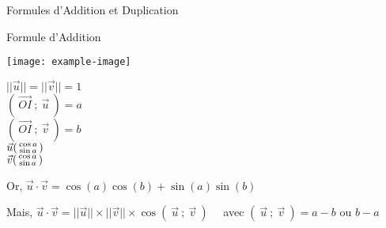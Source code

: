 \documentclass{cours}
\begin{document}
    \begin{Gpartie}{Formules d'Addition et Duplication} 
        \begin{Spartie}{Formule d'Addition} 
            \begin{center}
                    \texttt{[image: example-image]}
                \parbox{\linewidth}{}
            \end{center}
            $\lvert\lvert\vec{u}\rvert\rvert=\lvert\lvert\vec{v}\rvert\rvert=1$ \\ $\left(~\overrightarrow{OI}~;~\vec{u}~\right)=a$ \\ $\left(~\overrightarrow{OI}~;~\vec{v}~\right)=b$ \\ $\vec{u}\begin{psmallmatrix}\cos a \\ \sin a\end{psmallmatrix}$ \\ $\vec{v}\begin{psmallmatrix}\cos a \\ \sin a\end{psmallmatrix}$

            Or, $\vec{u}\cdot\vec{v}=\cos(a)\cos(b)+\sin(a)\sin(b)$
            
            Mais, $\vec{u}\cdot\vec{v}=\lvert\lvert\vec{u}\rvert\rvert\times\lvert\lvert\vec{v}\rvert\rvert\times\cos(~\vec{u}~;~\vec{v}~)\quad$ avec $(~\vec{u}~;~\vec{v}~)=a-b$ ou $b-a$ 


\end{Spartie}
\end{Gpartie}
\end{document}
